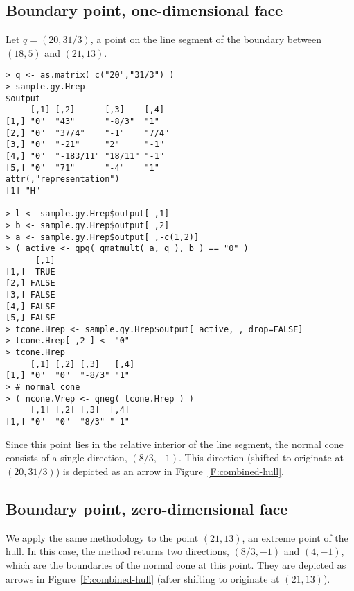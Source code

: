 \subsection{Boundary point, one-dimensional face} \label{S:ncone 1dim}
Let $q = (20, 31/3)$, a point on the line segment of the boundary
between $(18,5)$ and $(21,13)$.
{\singlespace
\begin{verbatim}
> q <- as.matrix( c("20","31/3") )
> sample.gy.Hrep
$output
     [,1] [,2]      [,3]    [,4] 
[1,] "0"  "43"      "-8/3"  "1"  
[2,] "0"  "37/4"    "-1"    "7/4"
[3,] "0"  "-21"     "2"     "-1" 
[4,] "0"  "-183/11" "18/11" "-1" 
[5,] "0"  "71"      "-4"    "1"  
attr(,"representation")
[1] "H"

> l <- sample.gy.Hrep$output[ ,1]
> b <- sample.gy.Hrep$output[ ,2]
> a <- sample.gy.Hrep$output[ ,-c(1,2)]
> ( active <- qpq( qmatmult( a, q ), b ) == "0" )
      [,1]
[1,]  TRUE
[2,] FALSE
[3,] FALSE
[4,] FALSE
[5,] FALSE
> tcone.Hrep <- sample.gy.Hrep$output[ active, , drop=FALSE]
> tcone.Hrep[ ,2 ] <- "0"
> tcone.Hrep
     [,1] [,2] [,3]   [,4]
[1,] "0"  "0"  "-8/3" "1" 
> # normal cone
> ( ncone.Vrep <- qneg( tcone.Hrep ) )
     [,1] [,2] [,3]  [,4]
[1,] "0"  "0"  "8/3" "-1"
\end{verbatim}
}
Since this point lies in the relative interior of the line segment,
the normal cone consists of a single direction, $(8/3, -1)$.
This direction (shifted to originate at $(20,31/3)$) is depicted 
as an arrow in Figure~\ref{F:combined-hull}.

\subsection{Boundary point, zero-dimensional face} \label{S:ncone 0dim}
We apply the same methodology to the point $(21,13)$, an extreme point of the hull.
%
In this case, the method returns two directions, 
$(8/3, -1)$ and $(4,-1)$, which are the boundaries of the normal cone at this point.
They are depicted as arrows in Figure~\ref{F:combined-hull} (after shifting to 
originate at $(21,13)$).

